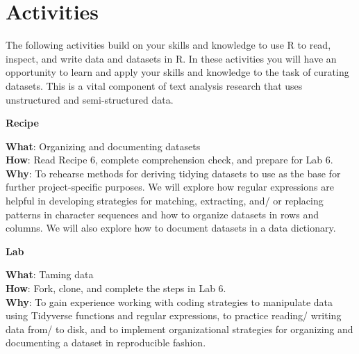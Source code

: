 \documentclass[
  letterpaper,
  krantz1]{latex/krantz-mod}
\theoremstyle{definition}
\theoremstyle{definition}
\theoremstyle{remark}
\begin{document}
\section*{Activities}\label{activities-4}


The following activities build on your skills and knowledge to use R to
read, inspect, and write data and datasets in R. In these activities you
will have an opportunity to learn and apply your skills and knowledge to
the task of curating datasets. This is a vital component of text
analysis research that uses unstructured and semi-structured data.

\begin{tcolorbox}[enhanced jigsaw, toprule=.15mm, breakable, colback=white, arc=.35mm, left=2mm, colframe=quarto-callout-color-frame, opacityback=0, bottomrule=.15mm, rightrule=.15mm, leftrule=.75mm]

\textbf{ Recipe}

\textbf{What}: Organizing and documenting datasets\\
\textbf{How}: Read Recipe 6, complete comprehension check, and prepare
for Lab 6.\\
\textbf{Why}: To rehearse methods for deriving tidying datasets to use
as the base for further project-specific purposes. We will explore how
regular expressions are helpful in developing strategies for matching,
extracting, and/ or replacing patterns in character sequences and how to
organize datasets in rows and columns. We will also explore how to
document datasets in a data dictionary.

\end{tcolorbox}

\pagebreak

\begin{tcolorbox}[enhanced jigsaw, toprule=.15mm, breakable, colback=white, arc=.35mm, left=2mm, colframe=quarto-callout-color-frame, opacityback=0, bottomrule=.15mm, rightrule=.15mm, leftrule=.75mm]

\textbf{ Lab}

\textbf{What}: Taming data\\
\textbf{How}: Fork, clone, and complete the steps in Lab 6.\\
\textbf{Why}: To gain experience working with coding strategies to
manipulate data using Tidyverse functions and regular expressions, to
practice reading/ writing data from/ to disk, and to implement
organizational strategies for organizing and documenting a dataset in
reproducible fashion.

\end{tcolorbox}
\end{document}
